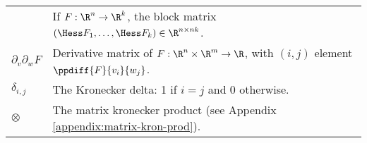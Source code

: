 \begin{table}[h!]
{\begin{tabular}{ll}
               & If \(F : \R^n \rightarrow \R^k\), the block matrix \((\Hess F_1, \ldots, \Hess F_k) \in \R^{n \times nk}\). \\
   \(\partial_v \partial_w F\) & Derivative matrix of \(F : \R^n \times \R^m \rightarrow \R\), with \((i,j)\) element \(\ppdiff{F}{v_i}{w_j}\). \\
   \(\delta_{i,j}\) & The Kronecker delta: 1 if \(i = j\) and 0 otherwise. \\
   \(\otimes\) & The matrix kronecker product (see Appendix \ref{appendix:matrix-kron-prod}). \\
   \bottomrule
\end{tabular}

}%
\end{table}

%
%
